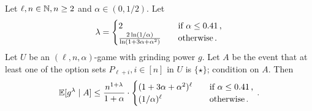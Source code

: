   \begin{theorem}\label{thm:xor-game-private-election}
      Let $\ell, n \in \mathbb{N}, n \geq 2$ and $\alpha \in (0, 1/2)$. 
      Let
      \begin{equation}\label{eq:lambda-star-poisson}
          \lambda = \begin{cases}
              2 & \quad\text{if $\alpha \leq 0.41$\,,}\\
              \frac{2 \ln(1/\alpha)}{\ln(1+3\alpha+\alpha^2)} &\quad\text{otherwise\,.}
          \end{cases}
      \end{equation}
      Let $U$ be an $(\ell, n, \alpha)$-game with grinding power $g$. 
      Let $A$ be the event that 
      at least one of the option sets $P_{\ell + i}, i \in [n]$ in $U$ is $\{\star\}$; 
      condition on $A$. 
      Then 
      $$
          \operatorname{\mathbb{E}}[g^\lambda \mid A] 
          \leq \frac{n^{1 + \lambda} }{1+\alpha} 
          \cdot \begin{cases}
              (1 + 3 \alpha + \alpha^2)^{\ell} &\quad\text{if $\alpha \leq 0.41$\,,} \\
              (1/\alpha)^\ell &\quad\text{otherwise\,.}
          \end{cases}
          \,.
      $$
  \end{theorem}
